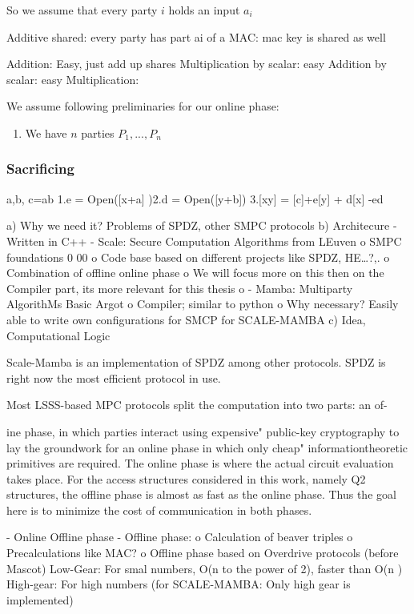 \documentclass[english,runningheads,a4paper]{llncs}[2018/03/10]
\begin{document}
So we assume that every party \(i\) holds an input \(a_i\)


Additive shared: every party has part ai of a
MAC: mac key is shared as well


Addition: Easy, just add up shares
Multiplication by scalar: easy
Addition by scalar: easy
Multiplication: 



We assume following preliminaries for our online phase:
\begin{enumerate}
\item We have \(n\) parties \(P_1,...,P_n\) 

\end{enumerate}




\subsubsection{Sacrificing}
a,b, c=ab
1.e = Open([x+a]
)2.d = Open([y+b])
3.[xy] = [c]+e[y] + d[x] -ed




a)	Why we need it? Problems of SPDZ, other SMPC protocols
b)	Architecure
-	Written in C++
-	Scale: Secure Computation Algorithms from LEuven
o	SMPC foundations
0 00 o	Code base based on different projects like SPDZ, HE…?,.
o	Combination of offline  online phase
o	We will focus more on this then on the Compiler part, its more relevant for this thesis
o	
-	Mamba: Multiparty AlgorithMs Basic Argot
o	Compiler; similar to python
o	Why necessary? Easily able to write own configurations for SMCP for SCALE-MAMBA
c)	Idea, Computational Logic

Scale-Mamba is an implementation of SPDZ among other protocols. SPDZ is right now the most efficient protocol in use. 

Most LSSS-based MPC protocols split the computation into two parts: an of-

ine phase, in which parties interact using expensive" public-key cryptography
to lay the groundwork for an online phase in which only cheap" informationtheoretic
primitives are required. The online phase is where the actual circuit
evaluation takes place. For the access structures considered in this work, namely
Q2 structures, the offline phase is almost as fast as the online phase. Thus the
goal here is to minimize the cost of communication in both phases.

-	Online  Offline phase
-	Offline phase:
o	Calculation of beaver triples
o	Precalculations like MAC?
o 	Offline phase based on Overdrive protocols (before Mascot)
		Low-Gear: For smal numbers, O(n to the power of 2), faster than O(n )
		High-gear: For high numbers (for SCALE-MAMBA: Only high gear is implemented)
\end{document}
